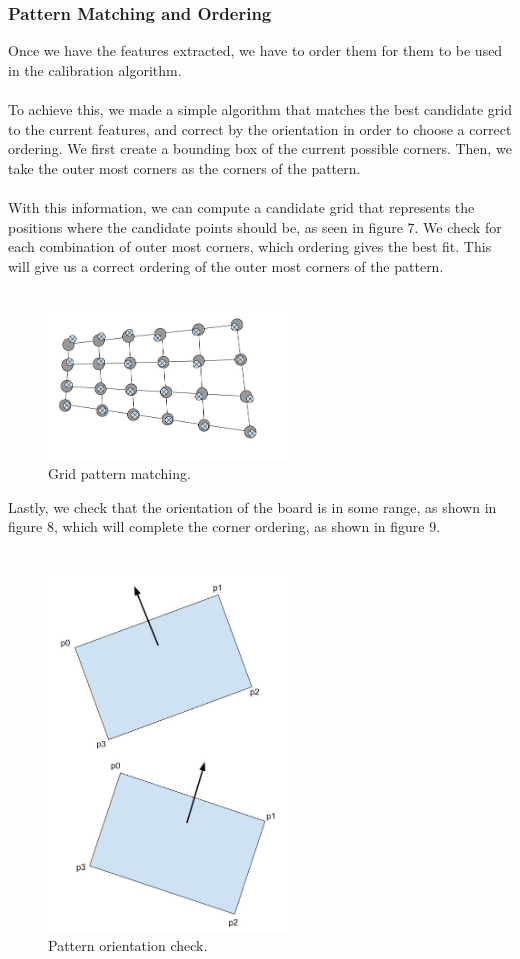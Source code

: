 \documentclass[journal]{IEEEtran}
\begin{document}
\subsubsection{ \textbf{ Pattern Matching and Ordering } }
Once we have the features extracted, we have to order them for them to be used in the calibration algorithm.
\\
\\
To achieve this, we made a simple algorithm that matches the best candidate grid to the current features, and correct by the orientation in order to choose a correct ordering. We first create a bounding box of the current possible corners. Then, we take the outer most corners as the corners of the pattern.
\\
\\
With this information, we can compute a candidate grid that represents the positions where the candidate points should be, as seen in figure 7. We check for each combination of outer most corners, which ordering gives the best fit. This will give us a correct ordering of the outer most corners of the pattern.
\\
\\
\begin{figure}[H]
\centering
\includegraphics[width=2.5in]{_img/img_report3_pattern_matching.jpg}
\caption{Grid pattern matching.}
\end{figure}
Lastly, we check that the orientation of the board is in some range, as shown in figure 8, which will complete the corner ordering, as shown in figure 9.
\\
\\
\begin{figure}[H]
\centering
\includegraphics[width=2.5in]{_img/img_pattern_orientation_checking.jpg}
\caption{Pattern orientation check.}
\end{figure}
\end{document}

